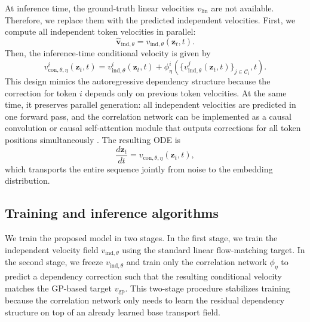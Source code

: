 \documentclass{article} %
\begin{document}
At inference time, the ground-truth linear velocities $v_{\text{lin}}$ are not available. 
Therefore, we replace them with the predicted independent velocities. 
First, we compute all independent token velocities in parallel:
\begin{equation}
    \hat{\mathbf{v}}_{\text{ind},\theta}
    =
    v_{\text{ind},\theta}(\mathbf{z}_t,t).
\end{equation}
Then, the inference-time conditional velocity is given by
\begin{equation}
    v_{\text{con},\theta,\eta}^{i}(\mathbf{z}_t,t)
    =
    v_{\text{ind},\theta}^{i}(\mathbf{z}_t,t)
    +
    \phi_\eta^{i}
    \left(
        \{
        v_{\text{ind},\theta}^{j}(\mathbf{z}_t,t)
        \}_{j \in \mathcal{C}_i}, t
    \right).
    \label{eq:inference_cond_velocity}
\end{equation}
This design mimics the autoregressive dependency structure because the correction for token $i$ depends only on previous token velocities. 
At the same time, it preserves parallel generation: all independent velocities are predicted in one forward pass, and the correlation network can be implemented as a causal convolution or causal self-attention module that outputs corrections for all token positions simultaneously \citep{vaswani2017attention}. 
The resulting ODE is
\begin{equation}
    \frac{d\mathbf{z}_t}{dt}
    =
    v_{\text{con},\theta,\eta}(\mathbf{z}_t,t),
\end{equation}
which transports the entire sequence jointly from noise to the embedding distribution.

\subsection{Training and inference algorithms}
\label{sec:algorithm}

We train the proposed model in two stages. 
In the first stage, we train the independent velocity field $v_{\mathrm{ind},\theta}$ using the standard linear flow-matching target. 
In the second stage, we freeze $v_{\mathrm{ind},\theta}$ and train only the correlation network $\phi_\eta$ to predict a dependency correction such that the resulting conditional velocity matches the GP-based target $v_{\mathrm{gp}}$. 
This two-stage procedure stabilizes training because the correlation network only needs to learn the residual dependency structure on top of an already learned base transport field.
\end{document}
